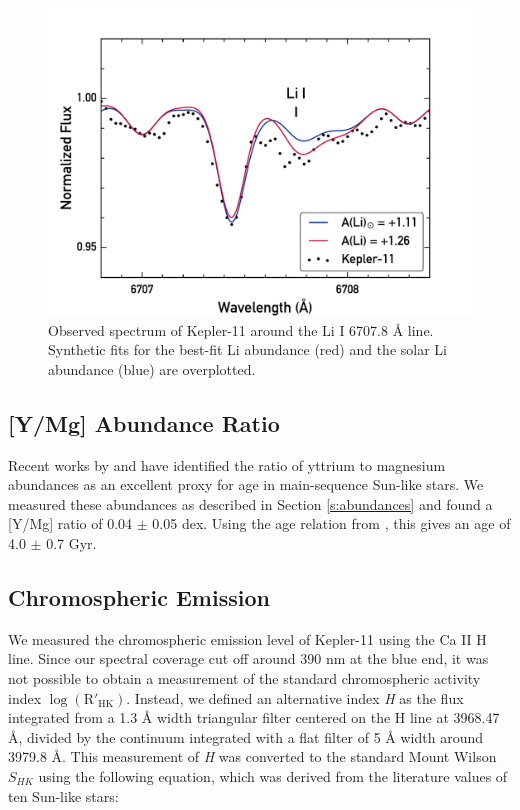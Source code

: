 \documentclass[oneside]{emulateapj}
\begin{document}
\begin{figure}
\centering
\includegraphics[width=\columnwidth]{lithium}
\caption{Observed spectrum of Kepler-11 around the Li I 6707.8 \r{A} line. Synthetic fits for the best-fit Li abundance (red) and the solar Li abundance (blue) are overplotted.}
\label{fig:lithium}
\end{figure}


\subsection{[Y/Mg] Abundance Ratio}

Recent works by \citet{Nissen2015} and \citet{TucciMaia2016} have identified the ratio of yttrium to magnesium abundances as an excellent proxy for age in main-sequence Sun-like stars. We measured these abundances as described in Section \ref{s:abundances} and found a [Y/Mg] ratio of 0.04 $\pm$ 0.05 dex. Using the age relation from \citet{TucciMaia2016}, this gives an age of 4.0 $\pm$ 0.7 Gyr.

\subsection{Chromospheric Emission}

We measured the chromospheric emission level of Kepler-11 using the Ca II H line. Since our spectral coverage cut off around 390 nm at the blue end, it was not possible to obtain a measurement of the standard chromospheric activity index $\log(\mathrm{R'_{HK}})$. Instead, we defined an alternative index \textit{H} as the flux integrated from a 1.3 \r{A} width triangular filter centered on the H line at 3968.47 \r{A}, divided by the continuum integrated with a flat filter of 5 \r{A} width around 3979.8 \r{A}. This measurement of \textit{H} was converted to the standard Mount Wilson $S_{HK}$ using the following equation, which was derived from the literature values of ten Sun-like stars:
\end{document}
